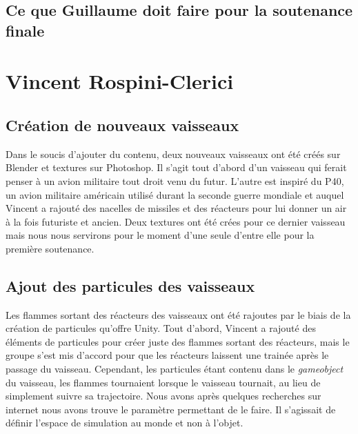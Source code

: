 \documentclass[10pt, titlepage]{report}
\begin{document}
\subsection{Ce que Guillaume doit faire pour la soutenance finale}

\section{Vincent Rospini-Clerici}

\subsection{Création de nouveaux vaisseaux}
Dans le soucis d'ajouter du contenu, deux nouveaux vaisseaux ont été créés sur Blender et textures sur Photoshop. Il s'agit tout d'abord d'un vaisseau qui ferait penser à un avion militaire tout droit venu du futur. L'autre est inspiré du P40, un avion militaire américain utilisé durant la seconde guerre mondiale et auquel Vincent a rajouté des nacelles de missiles et des réacteurs pour lui donner un air à la fois futuriste et ancien. Deux textures ont été crées pour ce dernier vaisseau mais nous nous servirons pour le moment d'une seule d'entre elle pour la première soutenance.\\

\subsection{Ajout des particules des vaisseaux}
Les flammes sortant des réacteurs des vaisseaux ont été rajoutes par le biais de la création de particules qu'offre Unity. Tout d'abord, Vincent a rajouté des éléments de particules pour créer juste des flammes sortant des réacteurs, mais le groupe s'est mis d'accord pour que les réacteurs laissent une trainée après le passage du vaisseau. Cependant, les particules étant contenu dans le \textit{gameobject} du vaisseau, les flammes tournaient lorsque le vaisseau tournait, au lieu de simplement suivre sa trajectoire. Nous avons après quelques recherches sur internet nous avons trouve le paramètre permettant de le faire. Il s'agissait de définir l'espace de simulation au monde et non à l'objet.\\
\end{document}

